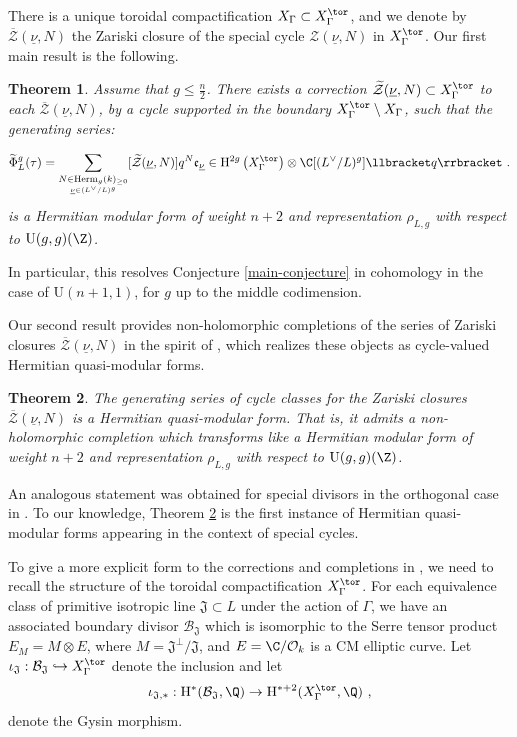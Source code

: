 \documentclass[11pt,letterpaper,english]{amsart}
\numberwithin{equation}{subsection}
\numberwithin{equation}{section}
\newcommand\cB{{\mathcal B}}
\newcommand\cO{{\mathcal O}}
\newcommand\cZ{{\mathcal Z}}
\newcommand\fJ{{\mathfrak J}}
\theoremstyle{plain}
\newtheorem{theorem}{Theorem}[section]
\theoremstyle{remark}
\begin{document}
There is a unique toroidal compactification $X_\Gamma \subset X_\Gamma^\tor$, and we denote by $\overline{\cZ}(\underline{\nu},N)$ the Zariski closure of the special cycle $\cZ(\underline{\nu},N)$ in $X^\tor_\Gamma$. Our first main result is the following.


\begin{theorem}\label{t:main-inexplicit-form}
Assume that $g\leq\frac{n}{2}$. There exists a correction $\widetilde{\cZ}(\underline{\nu},N)\subset X^\tor_\Gamma$ to each $ \overline{\cZ}(\underline{\nu},N)$, by a cycle supported in the boundary $X^\tor_\Gamma\setminus X_\Gamma$, such that the generating series: 

\[\widetilde{\Phi}_L^g(\tau) = \sum_{\underset{\underline{\nu}\in (L^\vee/L)^g}{N\in \mathrm{Herm}_{g}(k)_{\geq 0}}} [\widetilde{\cZ}(\underline{\nu},N)] q^N \mathfrak e_{\underline\nu}\in \mathrm{H}^{2g}\left(X^\tor_\Gamma \right)\otimes \C[(L^\vee/L)^g] \llbracket q \rrbracket~.\]
is a Hermitian modular form of weight $n+2$ and representation $\rho_{L,g}$ with respect to
$\mathrm{U}(g,g)(\Z)$.  
\end{theorem}
In particular, this resolves Conjecture \ref{main-conjecture} in cohomology in the case of $\mathrm{U}(n+1,1)$, for $g$ up to the middle codimension.
\medskip 


Our second result provides non-holomorphic completions of the series of Zariski closures $\overline{\cZ}(\underline{\nu},N)$ in the spirit of \cite{engel-greer-tayou}, which realizes these objects as cycle-valued Hermitian quasi-modular forms.

\begin{theorem}\label{main-completion}
    The generating series of cycle classes for the Zariski closures $\overline{\cZ}(\underline{\nu},N)$ is a Hermitian quasi-modular form. That is, it admits a non-holomorphic completion which transforms like a Hermitian modular form of weight $n+2$ and representation $\rho_{L,g}$ with respect to
$\mathrm{U}(g,g)(\Z)$.
\end{theorem}


An analogous statement was obtained for special divisors in the orthogonal case in \cite{engel-greer-tayou}. To our knowledge, Theorem \ref{main-completion} is the first instance of Hermitian quasi-modular forms appearing in the context of special cycles.
\medskip

To give a more explicit form to the corrections and completions in , we need to recall the structure of the toroidal compactification $X_\Gamma^\tor$. For each equivalence class of primitive isotropic line $\mathfrak J\subset L$ under the action of $\Gamma$, we have an associated boundary divisor $\cB_{\mathfrak J}$ which is isomorphic to the Serre tensor product $E_M = M\otimes E$, where $M=\mathfrak{J}^\bot/\mathfrak{J}$, and $E=\C/\cO_k$ is a CM elliptic curve. Let $\iota_\fJ:\cB_\fJ\hookrightarrow X_\Gamma^{\tor}$ denote the inclusion and let 
\[\iota_{\fJ,*}:\mathrm{H}^*(\cB_\fJ,\Q)\rightarrow \mathrm{H}^{*+2}(X_\Gamma^{\tor},\Q)~,\]
denote the Gysin morphism.
\end{document}
